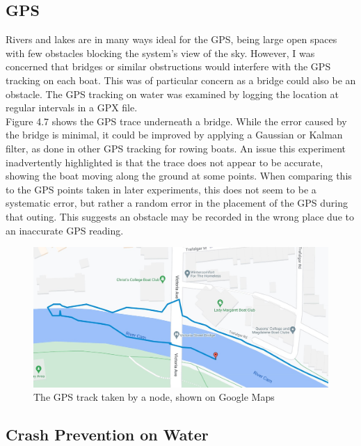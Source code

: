 \documentclass[12pt,a4paper]{report}
\begin{document}
\subsection{GPS}
Rivers and lakes are in many ways ideal for the GPS, being large open spaces with few obstacles blocking the system's view of the sky. However, I was concerned that bridges or similar obstructions would interfere with the GPS tracking on each boat. This was of particular concern as a bridge could also be an obstacle. The GPS tracking on water was examined by logging the location at regular intervals in a GPX file. \\
Figure 4.7 shows the GPS trace underneath a bridge. While the error caused by the bridge is minimal, it could be improved by applying a Gaussian or Kalman filter, as done in other GPS tracking for rowing boats. An issue this experiment inadvertently highlighted is that the trace does not appear to be accurate, showing the boat moving along the ground at some points. When comparing this to the GPS points taken in later experiments, this does not seem to be a systematic error, but rather a random error in the placement of the GPS during that outing. This suggests an obstacle may be recorded in the wrong place due to an inaccurate GPS reading.
\begin{figure}[h]
\begin{center}
\includegraphics[scale=0.3]{bridgeGPS.jpg}
\end{center}
\caption{The GPS track taken by a node, shown on Google Maps \cite{googlemapsgeneral}}
\end{figure}

\subsection{Crash Prevention on Water}
\end{document}
